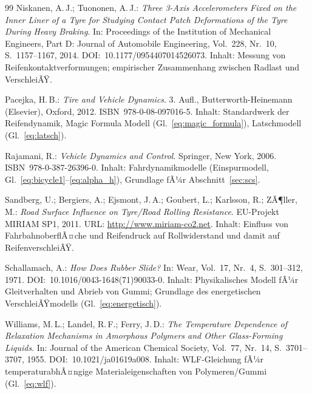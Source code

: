 ﻿\documentclass[12pt,a4paper]{article}
\theoremstyle{definition}
\theoremstyle{remark}
\begin{document}
\begin{thebibliography}{99}
Niskanen, A.\,J.; Tuononen, A.\,J.:
\textit{Three 3-Axis Accelerometers Fixed on the Inner Liner of a Tyre for
Studying Contact Patch Deformations of the Tyre During Heavy Braking}.
In: Proceedings of the Institution of Mechanical Engineers, Part D:
Journal of Automobile Engineering, Vol.~228, Nr.~10, S.~1157--1167, 2014.
DOI:~10.1177/0954407014526073.
Inhalt: Messung von Reifenkontaktverformungen; empirischer Zusammenhang
zwischen Radlast und VerschleiÃŸ.

Pacejka, H.\,B.: \textit{Tire and Vehicle Dynamics}. 3. Aufl.,
Butterworth-Heinemann (Elsevier), Oxford, 2012. ISBN~978-0-08-097016-5.
Inhalt: Standardwerk der Reifendynamik, Magic Formula Modell (Gl.~\ref{eq:magic_formula}),
Latschmodell (Gl.~\ref{eq:latsch}).

Rajamani, R.: \textit{Vehicle Dynamics and Control}.
Springer, New York, 2006. ISBN~978-0-387-26396-0.
Inhalt: Fahrdynamikmodelle (Einspurmodell, Gl.~\ref{eq:bicycle1}--\ref{eq:alpha_h}),
Grundlage fÃ¼r Abschnitt~\ref{sec:scs}.

Sandberg, U.; Bergiers, A.; Ejsmont, J.\,A.; Goubert, L.; Karlsson, R.;
ZÃ¶ller, M.: \textit{Road Surface Influence on Tyre/Road Rolling Resistance}.
EU-Projekt MIRIAM SP1, 2011. URL: \url{http://www.miriam-co2.net}.
Inhalt: Einfluss von FahrbahnoberflÃ¤che und Reifendruck auf Rollwiderstand
und damit auf ReifenverschleiÃŸ.

Schallamach, A.: \textit{How Does Rubber Slide?}
In: Wear, Vol.~17, Nr.~4, S.~301--312, 1971.
DOI:~10.1016/0043-1648(71)90033-0.
Inhalt: Physikalisches Modell fÃ¼r Gleitverhalten und Abrieb von Gummi;
Grundlage des energetischen VerschleiÃŸmodells (Gl.~\ref{eq:energetisch}).

Williams, M.\,L.; Landel, R.\,F.; Ferry, J.\,D.:
\textit{The Temperature Dependence of Relaxation Mechanisms in Amorphous Polymers
and Other Glass-Forming Liquids}.
In: Journal of the American Chemical Society, Vol.~77, Nr.~14, S.~3701--3707, 1955.
DOI:~10.1021/ja01619a008.
Inhalt: WLF-Gleichung fÃ¼r temperaturabhÃ¤ngige Materialeigenschaften von Polymeren/Gummi
(Gl.~\ref{eq:wlf}).

\end{thebibliography}
\end{document}
